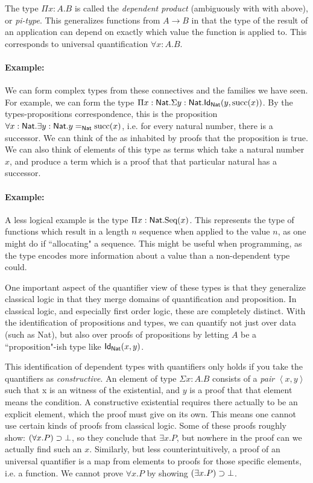 \documentclass[12pt]{article}
\begin{document}
The type $\Pi x:A.B$ is called the \emph{dependent product} (ambiguously with with above), or \emph{pi-type}. This generalizes functions from $A \to B$ in that the type of the result of an application can depend on exactly which value the function is applied to. This corresponds to universal quantification $\forall x:A.B$.

\paragraph{Example:} We can form complex types from these connectives and the families we have seen. For example, we can form the type $\Pi x:\mathsf{Nat}. \Sigma y:\mathsf{Nat}. \mathsf{Id}_{\mathsf{Nat}}(y, \text{succ}(x))$. By the types-propositions correspondence, this is the proposition $\forall x:\mathsf{Nat}. \exists y:\mathsf{Nat}. y =_{\mathsf{Nat}} \text{succ}(x)$, i.e. for every natural number, there is a successor. We can think of the as inhabited by proofs that the proposition is true. We can also think of elements of this type as terms which take a natural number $x$, and produce a term which is a proof that that particular natural has a successor.

\paragraph{Example:} A less logical example is the type $\Pi x: \mathsf{Nat}. \text{Seq}(x)$. This represents the type of functions which result in a length $n$ sequence when applied to the value $n$, as one might do if ``allocating" a sequence. This might be useful when programming, as the type encodes more information about a value than a non-dependent type could.

One important aspect of the quantifier view of these types is that they generalize classical logic in that they merge domains of quantification and proposition. In classical logic, and especially first order logic, these are completely distinct. With the identification of propositions and types, we can quantify not just over data (such as Nat), but also over proofs of propositions by letting $A$ be a ``proposition"-ish type like $\mathsf{Id}_{\mathsf{Nat}}(x,y)$.

This identification of dependent types with quantifiers only holds if you take the quantifiers as \emph{constructive}. An element of type $\Sigma x:A.B$ consists of a \emph{pair} $\left<x,y\right>$ such that x is an witness of the existential, and $y$ is a proof that that element means the condition. A constructive existential requires there actually to be an explicit element, which the proof must give on its own. This means one cannot use certain kinds of proofs from classical logic. Some of these proofs roughly show: $(\forall x. P) \supset \bot$, so they conclude that $\exists x. P$, but nowhere in the proof can we actually find such an $x$. Similarly, but less counterintuitively, a proof of an universal quantifier is a map from elements to proofs for those specific elements, i.e. a function. We cannot prove $\forall x.P$ by showing $(\exists x.P) \supset \bot$.
\end{document}
